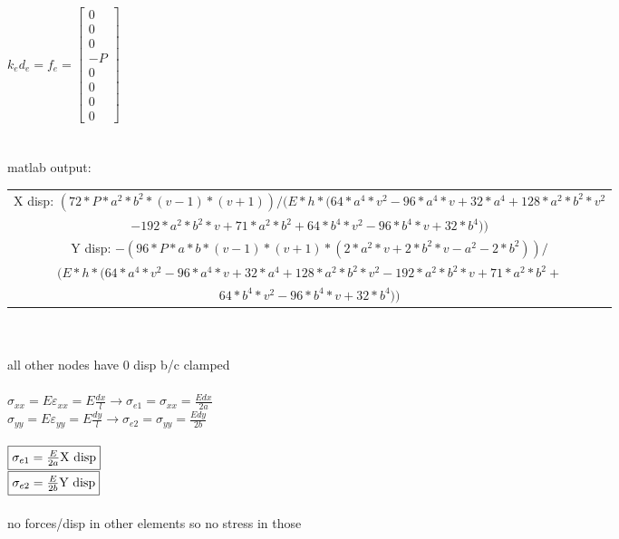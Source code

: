 \documentclass{article}
\begin{document}
$k_ed_e=f_e=\begin{bmatrix}
    0 \\ 0 \\ 0 \\ -P \\ 0 \\ 0 \\ 0 \\ 0
\end{bmatrix}$ \\\\\\
matlab output: \\
\begin{tabular}{|c|}
\hline
X disp: $(72*P*a^2*b^2*(v - 1)*(v + 1))/(E*h*(64*a^4*v^2 - 96*a^4*v + 32*a^4 + 128*a^2*b^2*v^2$ \\$ -
192*a^2*b^2*v + 71*a^2*b^2 + 64*b^4*v^2 - 96*b^4*v + 32*b^4))$ \\ \hline
Y disp:
$-(96*P*a*b*(v - 1)*(v + 1)*(2*a^2*v + 2*b^2*v - a^2 - 2*b^2))/ $\\$ (E*h*(64*a^4*v^2 -
96*a^4*v + 32*a^4 + 128*a^2*b^2*v^2 - 192*a^2*b^2*v + 71*a^2*b^2 + $\\$ 64*b^4*v^2
- 96*b^4*v + 32*b^4))$
\\ \hline
\end{tabular}
\\\\ all other nodes have 0 disp b/c clamped \\\\
$\sigma_{xx}=E\varepsilon_{xx}=E\frac{dx}{l} \rightarrow \sigma_{e1}=\sigma_{xx}=\frac{Edx}{2a}$ \\
$\sigma_{yy}=E\varepsilon_{yy}=E\frac{dy}{l} \rightarrow \sigma_{e2}=\sigma_{yy}=\frac{Edy}{2b}$ \\\\
$\fbox{$\sigma_{e1}=\frac{E}{2a}\textrm{X disp}$}$ \\
$\fbox{$\sigma_{e2}=\frac{E}{2b}\textrm{Y disp}$}$ \\\\
no forces/disp in other elements so no stress in those
\end{document}
